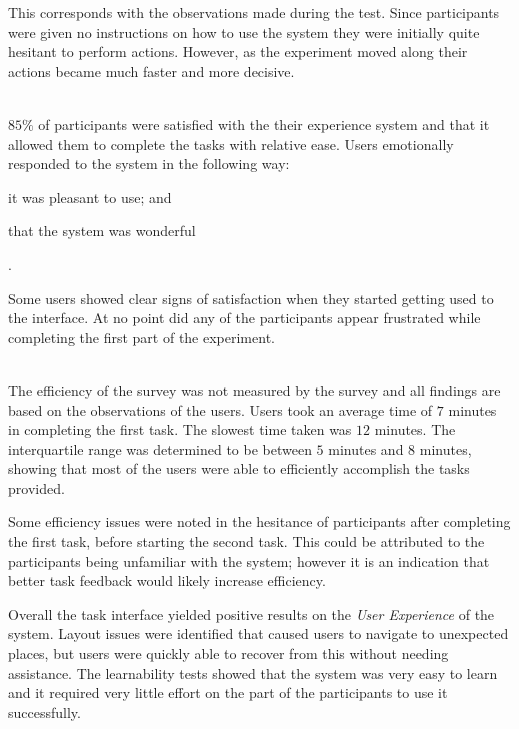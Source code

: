\documentclass[12pt,a4paper]{report}
\begin{document}
\begin{description}
    	This corresponds with the observations made during the test. Since
    	participants were given no instructions on how to use the system they
    	were initially quite hesitant to perform actions. However, as the
    	experiment moved along their actions became much faster and more
    	decisive.

     \item[Satisfaction] \hfill \\
        $85\%$ of participants were satisfied with the their experience
	system and that it allowed
        them to complete the tasks with relative ease. Users emotionally
        responded to the system in the following way: \begin{inparaenum}[(i)]
    	\item it was pleasant to use; and \item that the system was
        wonderful\end{inparaenum}. 

        Some users showed clear signs of satisfaction when they started getting
        used to the interface. At no point did any of the participants appear
        frustrated while completing the first part of the experiment.

    \item[Efficiency] \hfill \\
        The efficiency of the survey was not measured by the survey and all
        findings are based on the observations of the users. Users took an
        average time of $7$ minutes in completing the first task. The slowest
        time taken was $12$ minutes. The interquartile range was determined
        to be between $5$ minutes and $8$ minutes, showing that most of the 
        users were able to efficiently accomplish the tasks provided. 

        Some efficiency issues were noted in the hesitance of participants
        after completing the first task, before starting the second task.
        This could be attributed to the participants being unfamiliar with the
        system; however it is an indication that better task feedback would
        likely increase efficiency.
\end{description}
Overall the task interface yielded positive results on the \emph{User
Experience} of the system. Layout issues were identified that caused users
to navigate to unexpected places, but users were quickly able to recover from
this without needing assistance. The learnability tests showed that the system
was very easy to learn and it required very little effort on the part of the
participants to use it successfully. 
\end{document}
